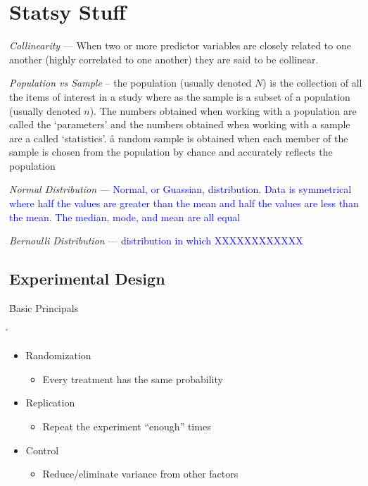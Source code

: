\chapter{Statsy Stuff}


\emph{Collinearity} --- When two or more predictor variables are closely related to one another (highly correlated to one another) they are said to be collinear.

\emph{Population vs Sample} -- the population (usually denoted $N$) is the collection of all the items of interest in a study where as the sample is a subset of a population (usually denoted $n$). The numbers obtained when working with a population are called the `parameters' and the numbers obtained when working with a sample are a called `statistics'. \r{a random sample is obtained when each member of the sample is chosen from the population by chance and accurately reflects the population}

\emph{Normal Distribution} --- \textcolor{blue}{Normal, or Guassian, distribution. Data is symmetrical where half the values are greater than the mean and half the values are less than the mean. The median, mode, and mean are all equal}

\emph{Bernoulli Distribution} --- \textcolor{blue}{distribution in which XXXXXXXXXXXX}

\section{Experimental Design}

\r{Basic Principals}

\r{
	\begin{itemize}[noitemsep,topsep=0pt]
		\item Randomization
		\begin{itemize}[noitemsep,topsep=0pt]
			\item Every treatment has the same probability
		\end{itemize}
		\item Replication
		\begin{itemize}[noitemsep,topsep=0pt]
			\item Repeat the experiment ``enough'' times
		\end{itemize}
		\item Control
		\begin{itemize}[noitemsep,topsep=0pt]
			\item Reduce/eliminate variance from other factors
		\end{itemize}
	\end{itemize}
}

